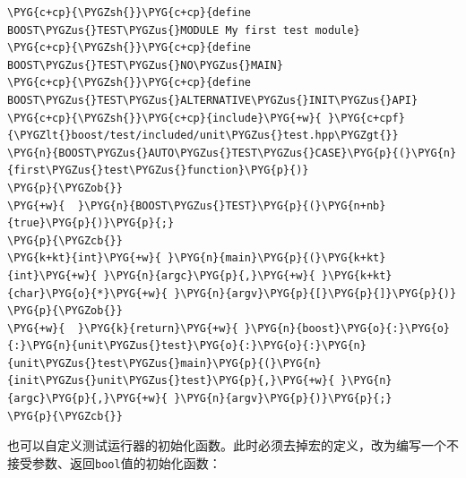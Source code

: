 
\begin{codeblockbg}
\begin{Verbatim}[commandchars=\\\{\},breaklines=true,breakanywhere=true,fontsize=\codefont,xleftmargin=17bp]
\PYG{c+cp}{\PYGZsh{}}\PYG{c+cp}{define BOOST\PYGZus{}TEST\PYGZus{}MODULE My first test module}
\PYG{c+cp}{\PYGZsh{}}\PYG{c+cp}{define BOOST\PYGZus{}TEST\PYGZus{}NO\PYGZus{}MAIN}
\PYG{c+cp}{\PYGZsh{}}\PYG{c+cp}{define BOOST\PYGZus{}TEST\PYGZus{}ALTERNATIVE\PYGZus{}INIT\PYGZus{}API}
\PYG{c+cp}{\PYGZsh{}}\PYG{c+cp}{include}\PYG{+w}{ }\PYG{c+cpf}{\PYGZlt{}boost/test/included/unit\PYGZus{}test.hpp\PYGZgt{}}
\PYG{n}{BOOST\PYGZus{}AUTO\PYGZus{}TEST\PYGZus{}CASE}\PYG{p}{(}\PYG{n}{first\PYGZus{}test\PYGZus{}function}\PYG{p}{)}
\PYG{p}{\PYGZob{}}
\PYG{+w}{  }\PYG{n}{BOOST\PYGZus{}TEST}\PYG{p}{(}\PYG{n+nb}{true}\PYG{p}{)}\PYG{p}{;}
\PYG{p}{\PYGZcb{}}
\PYG{k+kt}{int}\PYG{+w}{ }\PYG{n}{main}\PYG{p}{(}\PYG{k+kt}{int}\PYG{+w}{ }\PYG{n}{argc}\PYG{p}{,}\PYG{+w}{ }\PYG{k+kt}{char}\PYG{o}{*}\PYG{+w}{ }\PYG{n}{argv}\PYG{p}{[}\PYG{p}{]}\PYG{p}{)}
\PYG{p}{\PYGZob{}}
\PYG{+w}{  }\PYG{k}{return}\PYG{+w}{ }\PYG{n}{boost}\PYG{o}{:}\PYG{o}{:}\PYG{n}{unit\PYGZus{}test}\PYG{o}{:}\PYG{o}{:}\PYG{n}{unit\PYGZus{}test\PYGZus{}main}\PYG{p}{(}\PYG{n}{init\PYGZus{}unit\PYGZus{}test}\PYG{p}{,}\PYG{+w}{ }\PYG{n}{argc}\PYG{p}{,}\PYG{+w}{ }\PYG{n}{argv}\PYG{p}{)}\PYG{p}{;}
\PYG{p}{\PYGZcb{}}
\end{Verbatim}
\end{codeblockbg}



也可以自定义测试运行器的初始化函数。此时必须去掉宏的定义，改为编写一个不接受参数、返回\texttt{bool}值的初始化函数：



